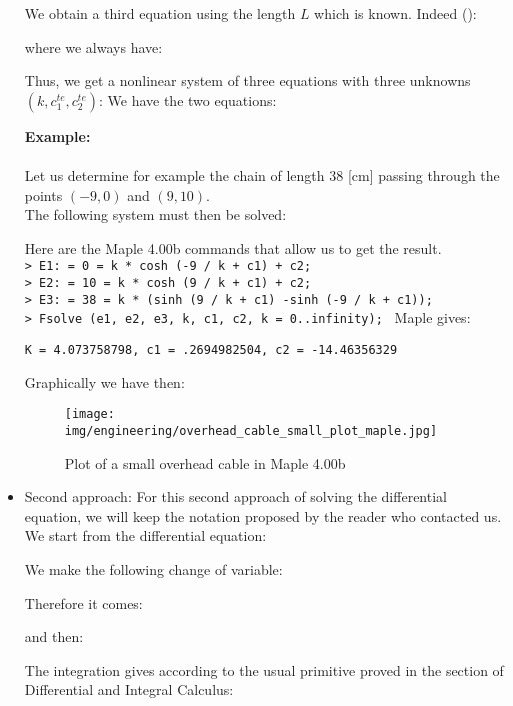 \begin{itemize}
		We obtain a third equation using the length $L$ which is known. Indeed ():
		
		where we always have:
		
		Thus, we get a nonlinear system of three equations with three unknowns $(k,c_1^{te},c_2^{te})$:
		We have the two equations:
		
		\begin{tcolorbox}[colframe=black,colback=white,sharp corners]
		\textbf{{\Large {}}Example:}\\\\
		Let us determine for example the chain of length $38$ [cm] passing through the points $(-9,0)$ and $(9,10)$.\\
	
		The following system must then be solved:
		
		Here are the Maple 4.00b commands that allow us to get the result.\\
		
		\texttt{> E1: = 0 = k * cosh (-9 / k + c1) + c2;\\
		> E2: = 10 = k * cosh (9 / k + c1) + c2;\\
		> E3: = 38 = k * (sinh (9 / k + c1) -sinh (-9 / k + c1));
		\\> Fsolve ({e1, e2, e3}, {k, c1, c2}, {k = 0..infinity});
		}
		Maple gives:
		\begin{center}
			\texttt{K = 4.073758798, c1 = .2694982504, c2 = -14.46356329}
		\end{center}
		Graphically we have then:
		\begin{figure}[H]
			\centering
			\texttt{[image: img/engineering/overhead\_cable\_small\_plot\_maple.jpg]}
			\caption{Plot of a small overhead cable in Maple 4.00b}
		\end{figure}
		\end{tcolorbox}	
		
	
		\item Second approach:
		For this second approach of solving the differential equation, we will keep the notation proposed by the reader who contacted us. We start from the differential equation:
		
		We make the following change of variable:
		
		Therefore it comes:
		
		and then:
		
		The integration gives according to the usual primitive proved in the section of Differential and Integral Calculus:
		

\end{itemize}
